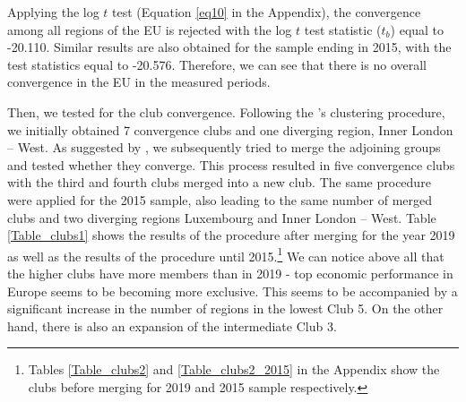 \documentclass[11pt]{article}
\begin{document}
Applying the log $t$ test (Equation \ref{eq10} in the Appendix), the convergence among all regions of the EU is rejected with the log $t$ test statistic ($t_b$) equal to -20.110. Similar results are also obtained for the sample ending in 2015, with the test statistics equal to -20.576. Therefore, we can see that there is no overall convergence in the EU in the measured periods.

Then, we tested for the club convergence. Following the \citeauthor{phillips2007transition}'s clustering procedure, we initially obtained 7 convergence clubs and one diverging region, Inner London – West. As suggested by \citet{bartkowska2012regional}, we subsequently tried to merge the adjoining groups and tested whether they converge. This process resulted in five convergence clubs with the third and fourth clubs merged into a new club. The same procedure were applied for the 2015 sample, also leading to the same number of merged clubs and two diverging regions Luxembourg and Inner London – West. Table \ref{Table_clubs1} shows the results of the procedure after merging for the year 2019 as well as the results of the \citeauthor{phillips2007transition} procedure until 2015.\footnote{Tables \ref{Table_clubs2} and \ref{Table_clubs2_2015} in the Appendix show the clubs before merging for 2019 and 2015 sample respectively.}  We can notice above all that the higher clubs have more members than in 2019 - top economic performance in Europe seems to be becoming more exclusive. This seems to be accompanied by a significant increase in the number of regions in the lowest Club 5. On the other hand, there is also an expansion of the intermediate Club 3.
\end{document}
